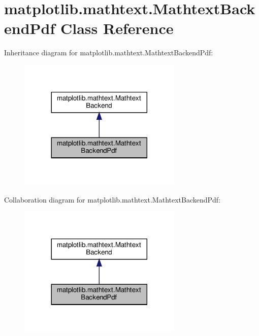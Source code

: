 \hypertarget{classmatplotlib_1_1mathtext_1_1MathtextBackendPdf}{}\section{matplotlib.\+mathtext.\+Mathtext\+Backend\+Pdf Class Reference}
\label{classmatplotlib_1_1mathtext_1_1MathtextBackendPdf}


Inheritance diagram for matplotlib.\+mathtext.\+Mathtext\+Backend\+Pdf\+:
\nopagebreak
\begin{figure}[H]
\begin{center}
\leavevmode
\includegraphics[width=221pt]{classmatplotlib_1_1mathtext_1_1MathtextBackendPdf__inherit__graph}
\end{center}
\end{figure}


Collaboration diagram for matplotlib.\+mathtext.\+Mathtext\+Backend\+Pdf\+:
\nopagebreak
\begin{figure}[H]
\begin{center}
\leavevmode
\includegraphics[width=221pt]{classmatplotlib_1_1mathtext_1_1MathtextBackendPdf__coll__graph}
\end{center}
\end{figure}
